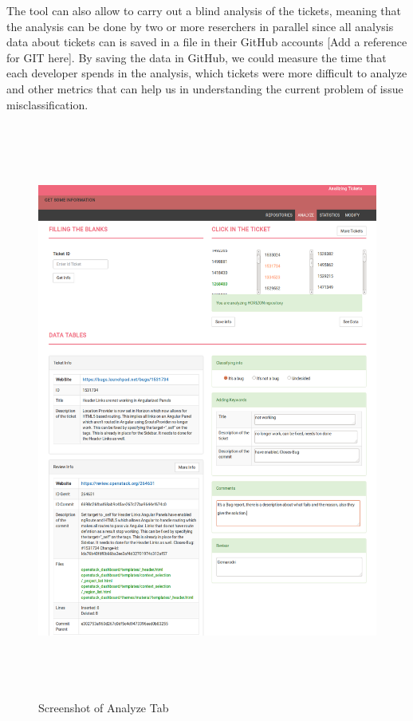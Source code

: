 \documentclass[runningheads,a4paper]{llncs}
\begin{document}
The tool can also allow to carry out a blind analysis of the tickets, meaning that the analysis can be done by two or more reserchers in parallel since all analysis data about tickets can is saved in a file in their GitHub accounts [Add a reference for GIT here]. By saving the data in GitHub, we could measure the time that each developer spends in the analysis, which tickets were more difficult to analyze and other metrics that can help us in understanding the current problem of issue misclassification.

\begin{figure}
\centering
\includegraphics[height=19cm]{index2.png}
\caption{Screenshot of Analyze Tab}
\label{fig:2}       %
\end{figure}
\end{document}
